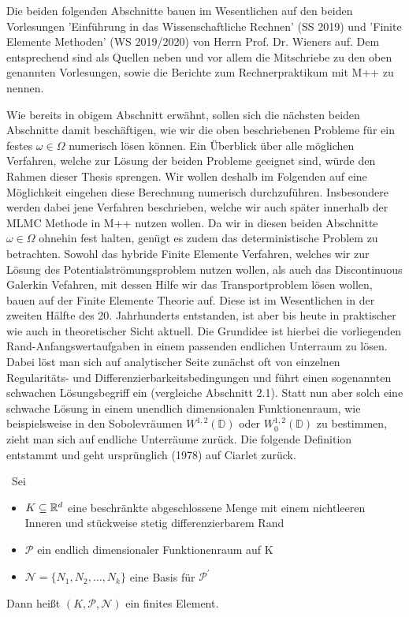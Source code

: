 \begin{Bemerkung}
	Die beiden folgenden Abschnitte bauen im Wesentlichen auf den beiden Vorlesungen 'Einführung in das Wissenschaftliche Rechnen' (SS 2019) und 'Finite Elemente Methoden' (WS 2019/2020) von Herrn Prof. Dr. Wieners auf. Dem entsprechend sind als Quellen neben \cite{brenner2007mathematical} und 
	\cite{braess2013finite} vor allem die Mitschriebe zu den oben genannten Vorlesungen, sowie die Berichte zum Rechnerpraktikum mit M++ \cite{siteM++} zu nennen.
\end{Bemerkung}
Wie bereits in obigem Abschnitt erwähnt, sollen sich die nächsten beiden Abschnitte damit beschäftigen, wie wir die oben beschriebenen Probleme für ein festes $\omega \in \Omega$ numerisch lösen können. 
Ein Überblick über alle möglichen Verfahren, welche zur Lösung der beiden Probleme geeignet sind, würde den Rahmen dieser Thesis sprengen. Wir wollen deshalb im Folgenden auf eine Möglichkeit eingehen diese Berechnung numerisch durchzuführen. Insbesondere werden dabei jene Verfahren beschrieben, welche wir auch später innerhalb der MLMC Methode in M++ nutzen wollen.
Da wir in diesen beiden Abschnitte $\omega \in \Omega$ ohnehin fest halten, genügt es zudem das deterministische Problem zu betrachten. \newline
Sowohl das hybride Finite Elemente Verfahren, welches wir zur Lösung des Potentialströmungsproblem nutzen wollen, als auch das Discontinuous Galerkin Vefahren, mit dessen Hilfe wir das Transportproblem lösen wollen, bauen auf der Finite Elemente Theorie auf. 
Diese ist im Wesentlichen in der zweiten Hälfte des 20. Jahrhunderts entstanden, ist aber bis heute in praktischer wie auch in theoretischer Sicht aktuell.
Die Grundidee ist hierbei die vorliegenden Rand-Anfangswertaufgaben in einem passenden endlichen Unterraum zu lösen. Dabei löst man sich auf analytischer Seite zunächst oft von einzelnen Regularitäts- und Differenzierbarkeitsbedingungen und führt einen sogenannten schwachen Lösungsbegriff ein (vergleiche Abschnitt 2.1). Statt nun aber solch eine schwache Lösung in einem unendlich dimensionalen Funktionenraum, wie beispielsweise in den Sobolevräumen $W^{1,2}(\mathbb{D})$ oder $W_0^{1,2}(\mathbb{D})$ zu bestimmen, zieht man sich auf endliche Unterräume zurück. \newline
Die folgende Definition entstammt \cite{brenner2007mathematical} und geht ursprünglich (1978) auf Ciarlet zurück.
\begin{Definition}\
	Sei
	\begin{itemize}
		\item $K \subseteq \mathbb{R}^d$ eine beschränkte abgeschlossene Menge mit einem nichtleeren Inneren und stückweise stetig differenzierbarem Rand 
		\item $\mathcal{P}$ ein endlich dimensionaler Funktionenraum auf K
		\item $\mathcal{N} = \{N_1,N_2,\dots,N_k \}$ eine Basis für $\mathcal{P}^{'}$
	\end{itemize}
	Dann heißt $(K,\mathcal{P},\mathcal{N})$ ein finites Element.
\end{Definition}

